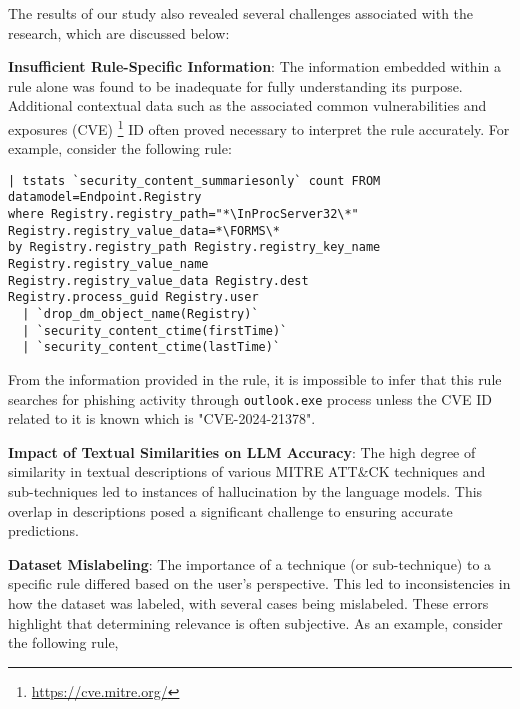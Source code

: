 The results of our study also revealed several challenges associated with the research, which are discussed below:

\noindent \textbf{Insufficient Rule-Specific Information}: The information embedded within a rule alone was found to be inadequate for fully understanding its purpose. 
Additional contextual data such as the associated common vulnerabilities and exposures (CVE) \footnote{\url{https://cve.mitre.org/}} ID often proved necessary to interpret the rule accurately.
For example, consider the following rule:
\begin{verbatim}
| tstats `security_content_summariesonly` count FROM
datamodel=Endpoint.Registry
where Registry.registry_path="*\InProcServer32\*" 
Registry.registry_value_data=*\FORMS\* 
by Registry.registry_path Registry.registry_key_name
Registry.registry_value_name 
Registry.registry_value_data Registry.dest
Registry.process_guid Registry.user 
  | `drop_dm_object_name(Registry)` 
  | `security_content_ctime(firstTime)` 
  | `security_content_ctime(lastTime)`
\end{verbatim}
\vspace{0.2cm}
\noindent From the information provided in the rule, it is impossible to infer that this rule searches for phishing activity through \texttt{outlook.exe} process unless the CVE ID related to it is known which is "CVE-2024-21378".

\noindent \textbf{Impact of Textual Similarities on LLM Accuracy}: The high degree of similarity in textual descriptions of various MITRE ATT\&CK techniques and sub-techniques led to instances of hallucination by the language models. 
This overlap in descriptions posed a significant challenge to ensuring accurate predictions.

\noindent \textbf{Dataset Mislabeling}: The importance of a technique (or sub-technique) to a specific rule differed based on the user's perspective. 
This led to inconsistencies in how the dataset was labeled, with several cases being mislabeled. 
These errors highlight that determining relevance is often subjective.
As an example, consider the following rule,\\

